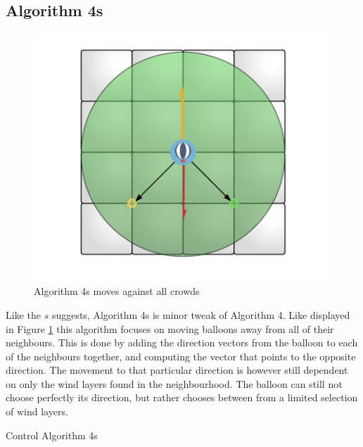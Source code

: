 \subsection{Algorithm 4s}
\begin{figure}
\centering
\includegraphics[scale = 0.3]{graphics/alg4s.pdf}
\caption{Algorithm 4s moves against all crowds}
\label{fig:alg4s}
\end{figure}

Like the $s$ suggests, Algorithm 4s is minor tweak of Algorithm 4. Like displayed in Figure \ref{fig:alg4s} this algorithm focuses on moving balloons away from all of their neighbours. This is done by adding the direction vectors from the balloon to each of the neighbours together, and computing the vector that points to the opposite direction. The movement to that particular direction is however still dependent on only the wind layers found in the neighbourhood. The balloon can still not choose perfectly its direction, but rather chooses between from a limited selection of wind layers.

\begin{algorithm}[H]
\caption{Control Algorithm 4s}
\label{alg:4s}
\end{algorithm}


